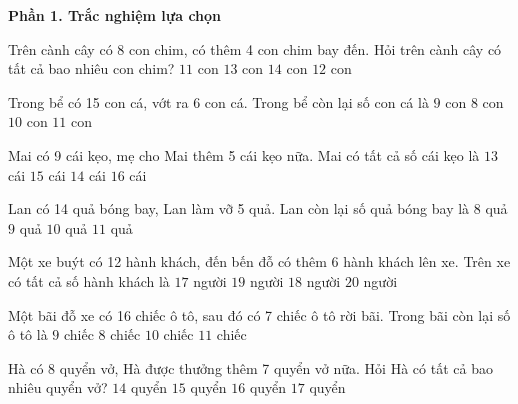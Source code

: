 \textbf{Phần 1. Trắc nghiệm lựa chọn}

\begin{ex} %
Trên cành cây có 8 con chim, có thêm 4 con chim bay đến. Hỏi trên cành cây có tất cả bao nhiêu con chim?
\choice
{$11$ con}
{$13$ con}
{$14$ con}
{\True $12$ con}
\end{ex}

\begin{ex} %
Trong bể có 15 con cá, vớt ra 6 con cá. Trong bể còn lại số con cá là
\choice
{\True $9$ con}
{$8$ con}
{$10$ con}
{$11$ con}
\end{ex}

\begin{ex} %
Mai có 9 cái kẹo, mẹ cho Mai thêm 5 cái kẹo nữa. Mai có tất cả số cái kẹo là
\choice
{$13$ cái}
{$15$ cái}
{\True $14$ cái}
{$16$ cái}
\end{ex}

\begin{ex} %
Lan có 14 quả bóng bay, Lan làm vỡ 5 quả. Lan còn lại số quả bóng bay là
\choice
{$8$ quả}
{\True $9$ quả}
{$10$ quả}
{$11$ quả}
\end{ex}

\begin{ex} %
Một xe buýt có 12 hành khách, đến bến đỗ có thêm 6 hành khách lên xe. Trên xe có tất cả số hành khách là
\choice
{$17$ người}
{$19$ người}
{\True $18$ người}
{$20$ người}
\end{ex}

\begin{ex} %
Một bãi đỗ xe có 16 chiếc ô tô, sau đó có 7 chiếc ô tô rời bãi. Trong bãi còn lại số ô tô là
\choice
{\True $9$ chiếc}
{$8$ chiếc}
{$10$ chiếc}
{$11$ chiếc}
\end{ex}

\begin{ex} %
Hà có 8 quyển vở, Hà được thưởng thêm 7 quyển vở nữa. Hỏi Hà có tất cả bao nhiêu quyển vở?
\choice
{$14$ quyển}
{\True $15$ quyển}
{$16$ quyển}
{$17$ quyển}
\end{ex}

